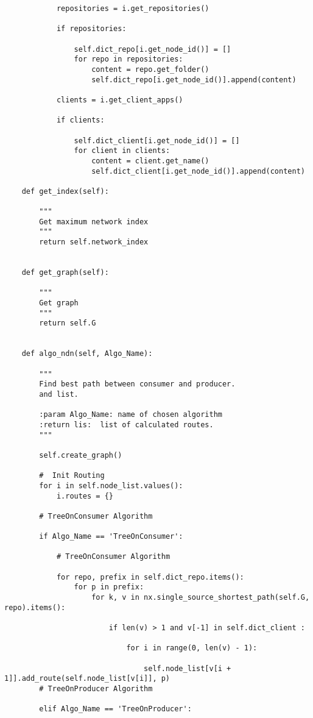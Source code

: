 \begin{lstlisting}
            repositories = i.get_repositories()

            if repositories:

                self.dict_repo[i.get_node_id()] = []
                for repo in repositories:
                    content = repo.get_folder()
                    self.dict_repo[i.get_node_id()].append(content)

            clients = i.get_client_apps()

            if clients:

                self.dict_client[i.get_node_id()] = []
                for client in clients:
                    content = client.get_name()
                    self.dict_client[i.get_node_id()].append(content)

    def get_index(self):

        """
        Get maximum network index
        """
        return self.network_index
        

    def get_graph(self):

        """
        Get graph
        """
        return self.G
        

    def algo_ndn(self, Algo_Name):

        """
        Find best path between consumer and producer. 
        and list.

        :param Algo_Name: name of chosen algorithm
        :return lis:  list of calculated routes.
        """

        self.create_graph()

        #  Init Routing
        for i in self.node_list.values():
            i.routes = {}

        # TreeOnConsumer Algorithm

        if Algo_Name == 'TreeOnConsumer':

            # TreeOnConsumer Algorithm

            for repo, prefix in self.dict_repo.items():
                for p in prefix:
                    for k, v in nx.single_source_shortest_path(self.G, repo).items():

                        if len(v) > 1 and v[-1] in self.dict_client :

                            for i in range(0, len(v) - 1):

                                self.node_list[v[i + 1]].add_route(self.node_list[v[i]], p)
        # TreeOnProducer Algorithm

        elif Algo_Name == 'TreeOnProducer':


\end{lstlisting}
